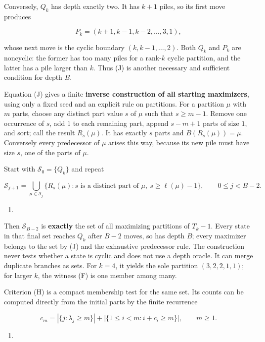 \documentclass[11pt,a4paper]{article}
\providecommand{\tightlist}{\setlength{\itemsep}{0pt}\setlength{\parskip}{0pt}}
\begin{document}
Conversely, \(Q_k\) has depth exactly two. It has \(k+1\) piles, so its first move produces

\[
P_k=(k+1,k-1,k-2,\ldots,3,1),
\]

whose next move is the cyclic boundary \((k,k-1,\ldots,2)\). Both \(Q_k\) and \(P_k\) are noncyclic: the former has too many piles for a rank-\(k\) cyclic partition, and the latter has a pile larger than \(k\). Thus (J) is another necessary and sufficient condition for depth \(B\).

Equation (J) gives a finite \textbf{inverse construction of all starting maximizers}, using only a fixed seed and an explicit rule on partitions. For a partition \(\mu\) with \(m\) parts, choose any distinct part value \(s\) of \(\mu\) such that \(s\ge m-1\). Remove one occurrence of \(s\), add \(1\) to each remaining part, append \(s-m+1\) parts of size \(1\), and sort; call the result \(R_s(\mu)\). It has exactly \(s\) parts and \(B(R_s(\mu))=\mu\). Conversely every predecessor of \(\mu\) arises this way, because its new pile must have size \(s\), one of the parts of \(\mu\).

Start with \(\mathcal S_0=\{Q_k\}\) and repeat

\[
\mathcal S_{j+1}=\bigcup_{\mu\in\mathcal S_j}
  \{R_s(\mu):s\text{ is a distinct part of }\mu,\ s\ge\ell(\mu)-1\},
  \qquad 0\le j<B-2.
\]

\begin{enumerate}
\def\labelenumi{(\Alph{enumi})}
\setcounter{enumi}{10}
\tightlist
\item
\end{enumerate}

Then \(\mathcal S_{B-2}\) is \textbf{exactly} the set of all maximizing partitions of \(T_k-1\). Every state in that final set reaches \(Q_k\) after \(B-2\) moves, so has depth \(B\); every maximizer belongs to the set by (J) and the exhaustive predecessor rule. The construction never tests whether a state is cyclic and does not use a depth oracle. It can merge duplicate branches as sets. For \(k=4\), it yields the sole partition \((3,2,2,1,1)\); for larger \(k\), the witness (F) is one member among many.

Criterion (H) is a compact membership test for the same set. Its counts can be computed directly from the initial parts by the finite recurrence

\[
c_m=|\{j:\lambda_j\ge m\}|
  +|\{1\le i<m:i+c_i\ge m\}|,\qquad m\ge1.
\]

\begin{enumerate}
\def\labelenumi{(\Roman{enumi})}
\tightlist
\item
\end{enumerate}
\end{document}
